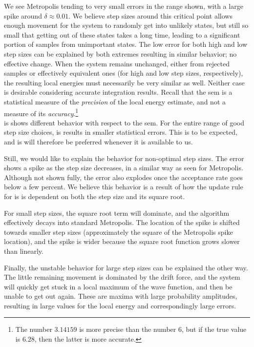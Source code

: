 \documentclass[Thesis.tex]{subfiles}
\begin{document}
We see Metropolis tending to very small errors in the range shown, with a large
spike around $\delta \approx 0.01$. We believe step sizes around this critical
point allows enough movement for the system to randomly get into unlikely
states, but still so small that getting out of these states takes a long time,
leading to a significant portion of samples from unimportant states. The low
error for both high and low step sizes can be explained by both extremes
resulting in similar behavior; no effective change. When the system remains
unchanged, either from rejected samples or effectively equivalent ones (for high
and low step sizes, respectively), the resulting local energies must necessarily
be very similar as well. Neither case is desirable considering accurate
integration results. Recall that the \gls{sem} is a statistical measure of
the \emph{precision} of the local energy estimate, and not a measure of its
\emph{accuracy}.\footnote{The number $3.14159$ is more precise than the number
$6$, but if the true value is $6.28$, then the latter is more accurate.}\\

\Gls{is} shows different behavior with respect to the \gls{sem}.
For the entire range of good step size choices, \gls{is} results in
smaller statistical errors. This is to be expected, and \gls{is} will
therefore be preferred whenever it is available to us.

Still, we would like to explain the behavior for non-optimal step sizes. The
error shows a spike as the step size decreases, in a similar way as seen for
Metropolis. Although not shown fully, the error also explodes once the
acceptance rate goes below a few percent. We believe this behavior is a result
of how the update rule for \gls{is} is dependent on both the step
size and its square root.

For small step sizes, the square root term will dominate, and the algorithm
effectively decays into standard Metropolis. The location of the spike is
shifted towards smaller step sizes (approximately the square of the Metropolis
spike location), and the spike is wider because the square root function grows
slower than linearly.

Finally, the unstable behavior for large step sizes can be explained the other
way. The little remaining movement is dominated by the drift force, and the
system will quickly get stuck in a local maximum of the wave function, and then be
unable to get out again. These are maxima with large probability amplitudes,
resulting in large values for the local energy and correspondingly large errors.
\end{document}
